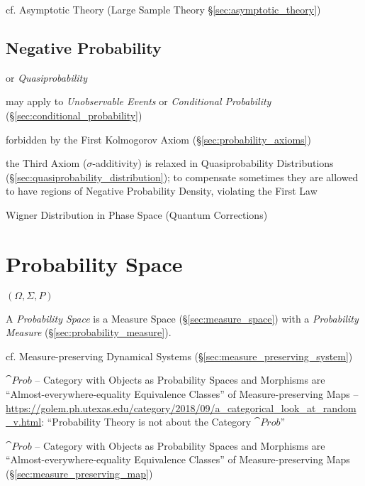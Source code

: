 \fist cf. Asymptotic Theory (Large Sample Theory \S\ref{sec:asymptotic_theory})



\subsection{Negative Probability}\label{sec:negative_probability}

or \emph{Quasiprobability}

may apply to \emph{Unobservable Events} or \emph{Conditional Probability}
(\S\ref{sec:conditional_probability})

forbidden by the First Kolmogorov Axiom (\S\ref{sec:probability_axioms})

the Third Axiom ($\sigma$-additivity) is relaxed in Quasiprobability
Distributions (\S\ref{sec:quasiprobability_distribution}); to compensate
sometimes they are allowed to have regions of Negative Probability Density,
violating the First Law

Wigner Distribution in Phase Space (Quantum Corrections)



\section{Probability Space}\label{sec:probability_space}

$(\Omega, \Sigma, P)$

A \emph{Probability Space} is a Measure Space (\S\ref{sec:measure_space}) with a
\emph{Probability Measure} (\S\ref{sec:probability_measure}).

\fist cf. Measure-preserving Dynamical Systems
(\S\ref{sec:measure_preserving_system})

$\cat{Prob}$ -- Category with Objects as Probability Spaces and Morphisms are
``Almost-everywhere-equality Equivalence Classes'' of Measure-preserving Maps
--
\url{https://golem.ph.utexas.edu/category/2018/09/a_categorical_look_at_random_v.html}:
``Probability Theory is not about the Category $\cat{Prob}$''

$\cat{Prob}$ -- Category with Objects as Probability Spaces and Morphisms are
``Almost-everywhere-equality Equivalence Classes'' of Measure-preserving Maps
(\S\ref{sec:measure_preserving_map})

